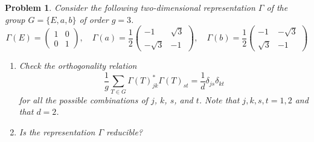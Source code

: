 \documentclass[UTF8,10pt,a4paper]{article}
\theoremstyle{Problem}
\newtheorem{prob}{Problem}
\theoremstyle{Solution}
\begin{document}
\begin{prob}
    Consider the following two-dimensional representation $\Gamma$ of the group $G=\{E,a,b\}$ of order $g=3$.
    \[
        \Gamma(E)=\left(\begin{matrix}
            1&0\\
            0&1
        \end{matrix}\right),\quad\Gamma(a)=\frac{1}{2}\left(\begin{matrix}
            -1&\sqrt{3}\\
            -\sqrt{3}&-1
        \end{matrix}\right),\quad\Gamma(b)=\frac{1}{2}\left(\begin{matrix}
            -1&-\sqrt{3}\\
            \sqrt{3}&-1
        \end{matrix}\right)
    \]
    \begin{enumerate}
        \item[(a)] Check the orthogonality relation
        \begin{equation}
            \frac{1}{g}\sum_{T\in G}\Gamma(T)_{jk}^*\Gamma(T)_{st}=\frac{1}{d}\delta_{js}\delta_{kt}
        \end{equation}
        for all the possible combinations of $j$, $k$, $s$, and $t$. Note that $j,k,s,t=1,2$ and that $d=2$.
        \item[(b)] Is the representation $\Gamma$ reducible?
    \end{enumerate}
\end{prob}
\end{document}
